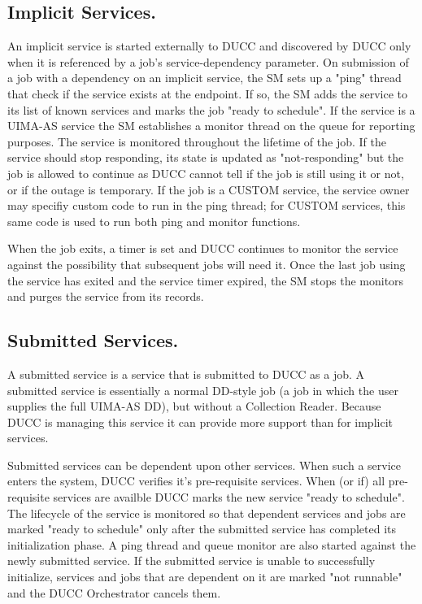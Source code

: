       \subsection{Implicit Services.} An implicit service is started externally to DUCC and discovered by DUCC only
      when it is referenced by a job's service-dependency parameter. On submission of a job with a
      dependency on an implicit service, the SM sets up a "ping" thread that check if the service
      exists at the endpoint. If so, the SM adds the service to its list of known services and marks
      the job "ready to schedule". If the service is a UIMA-AS service the SM establishes a monitor
      thread on the queue for reporting purposes. The service is monitored throughout the lifetime of
      the job. If the service should stop responding, its state is updated as "not-responding" but the
      job is allowed to continue as DUCC cannot tell if the job is still using it or not, or if the
      outage is temporary. If the job is a CUSTOM service, the service owner may specifiy custom code
      to run in the ping thread; for CUSTOM services, this same code is used to run both ping and
      monitor functions.
      
      When the job exits, a timer is set and DUCC continues to monitor the service against the
      possibility that subsequent jobs will need it. Once the last job using the service has exited
      and the service timer expired, the SM stops the monitors and purges the service from its
      records.
      
      \subsection{Submitted Services.} A submitted service is a service that is submitted to DUCC as a job. A
      submitted service is essentially a normal DD-style job (a job in which the user supplies the
      full UIMA-AS DD), but without a Collection Reader. Because DUCC is managing this service it can
      provide more support than for implicit services.
      
      Submitted services can be dependent upon other services. When such a service enters the system,
      DUCC verifies it's pre-requisite services. When (or if) all pre-requisite services are availble
      DUCC marks the new service "ready to schedule". The lifecycle of the service is monitored so
      that dependent services and jobs are marked "ready to schedule" only after the submitted service
      has completed its initialization phase. A ping thread and queue monitor are also started against
      the newly submitted service. If the submitted service is unable to successfully initialize,
      services and jobs that are dependent on it are marked "not runnable" and the DUCC Orchestrator
      cancels them.
      

